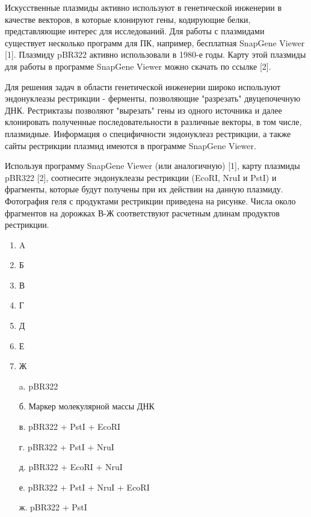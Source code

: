
Искусственные плазмиды активно используют в генетической инженерии в качестве векторов, в которые клонируют гены, кодирующие белки, представляющие интерес для исследований. Для работы с плазмидами существует несколько программ для ПК, например, бесплатная SnapGene Viewer [1].
Плазмиду pBR322 активно использовали в 1980-е годы. Карту этой плазмиды для работы в программе SnapGene Viewer можно скачать по ссылке [2]. 

Для решения задач в области генетической инженерии широко используют эндонуклеазы рестрикции - ферменты, позволяющие "разрезать" двуцепочечную ДНК. Рестриктазы позволяют "вырезать" гены из одного источника и далее клонировать полученные последовательности в различные векторы, в том числе, плазмидные. Информация о специфичности эндонуклеаз рестрикции, а также сайты рестрикции плазмид имеются в программе SnapGene Viewer.

Используя программу SnapGene Viewer (или аналогичную) [1], карту плазмиды pBR322 [2], соотнесите эндонуклеазы рестрикции (EcoRI, NruI и PstI) и фрагменты, которые будут получены при их действии на данную плазмиду. Фотография геля с продуктами рестрикции приведена на рисунке. Числа около фрагментов на дорожках В-Ж соответствуют расчетным длинам продуктов рестрикции.


        \begin{enumerate}
            \item A
            \item Б
            \item В
            \item Г
            \item Д
            \item Е
            \item Ж
        \end{enumerate}

        \begin{enumerate}
            \item[a.] pBR322
            \item[б.] Маркер молекулярной массы ДНК
            \item[в.] pBR322 + PstI + EcoRI
            \item[г.] pBR322 + PstI + NruI
            \item[д.] pBR322 + EcoRI + NruI
            \item[е.] pBR322 + PstI + NruI + EcoRI
            \item[ж.] pBR322 + PstI
        \end{enumerate}

